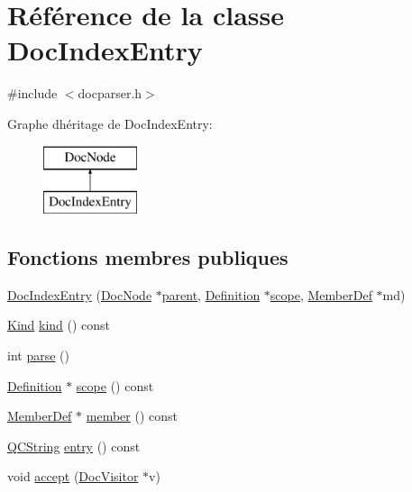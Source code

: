 \hypertarget{class_doc_index_entry}{}\section{Référence de la classe Doc\+Index\+Entry}
\label{class_doc_index_entry}


{\ttfamily \#include $<$docparser.\+h$>$}

Graphe d\textquotesingle{}héritage de Doc\+Index\+Entry\+:\begin{figure}[H]
\begin{center}
\leavevmode
\includegraphics[height=2.000000cm]{class_doc_index_entry}
\end{center}
\end{figure}
\subsection*{Fonctions membres publiques}
\begin{DoxyCompactItemize}
\item 
\hyperlink{class_doc_index_entry_a9e5a1d9e1d68e7da638b3f87bc658a9d}{Doc\+Index\+Entry} (\hyperlink{class_doc_node}{Doc\+Node} $\ast$\hyperlink{class_doc_node_a990d8b983962776a647e6231d38bd329}{parent}, \hyperlink{class_definition}{Definition} $\ast$\hyperlink{class_doc_index_entry_adb25dfc3075c605bd043e665e20a40f0}{scope}, \hyperlink{class_member_def}{Member\+Def} $\ast$md)
\item 
\hyperlink{class_doc_node_aebd16e89ca590d84cbd40543ea5faadb}{Kind} \hyperlink{class_doc_index_entry_ad0521249b714be998798243d517e1a00}{kind} () const 
\item 
int \hyperlink{class_doc_index_entry_a32f8c84b803b04fd2de18d647593c8fe}{parse} ()
\item 
\hyperlink{class_definition}{Definition} $\ast$ \hyperlink{class_doc_index_entry_adb25dfc3075c605bd043e665e20a40f0}{scope} () const 
\item 
\hyperlink{class_member_def}{Member\+Def} $\ast$ \hyperlink{class_doc_index_entry_a47f20499d08e7410b7b0635c1b58f574}{member} () const 
\item 
\hyperlink{class_q_c_string}{Q\+C\+String} \hyperlink{class_doc_index_entry_a76552fc2727e4dfc1d7240ba25694230}{entry} () const 
\item 
void \hyperlink{class_doc_index_entry_a509e4da75e8dbfaf40488509357c6e3c}{accept} (\hyperlink{class_doc_visitor}{Doc\+Visitor} $\ast$v)
\end{DoxyCompactItemize}

